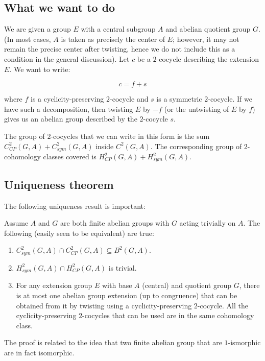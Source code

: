\documentclass[10pt]{amsart}
\begin{document}
\subsection{What we want to do}

We are given a group $E$ with a central subgroup $A$ and abelian
quotient group $G$. (In most cases, $A$ is taken as precisely the
center of $E$; however, it may not remain the precise center after
twisting, hence we do not include this as a condition in the general
discussion). Let $c$ be a $2$-cocycle describing the extension $E$. We
want to write:

$$c = f + s$$

where $f$ is a cyclicity-preserving $2$-cocycle and $s$ is a symmetric
$2$-cocycle. If we have such a decomposition, then twisting $E$ by
$-f$ (or the untwisting of $E$ by $f$) gives us an abelian group
described by the $2$-cocycle $s$.

The group of $2$-cocycles that we can write in this form is the sum
$C^2_{CP}(G,A) + C^2_{sym}(G,A)$ inside $C^2(G,A)$. The corresponding
group of $2$-cohomology classes covered is $H^2_{CP}(G,A) +
H^2_{sym}(G,A)$.

\subsection{Uniqueness theorem}

The following uniqueness result is important:

\begin{theorem}\label{uniqueness}
  Assume $A$ and $G$ are both finite abelian groups with $G$ acting
  trivially on $A$. The following (easily seen to be equivalent) are
  true:
  \begin{enumerate}
  \item $C^2_{sym}(G,A) \cap C^2_{CP}(G,A) \subseteq B^2(G,A)$.
  \item $H^2_{sym}(G,A) \cap H^2_{CP}(G,A)$ is trivial.
  \item For any extension group $E$ with base $A$ (central) and
    quotient group $G$, there is at most one abelian group extension
    (up to congruence) that can be obtained from it by twisting using
    a cyclicity-preserving $2$-cocycle. All the cyclicity-preserving
    $2$-cocycles that can be used are in the same cohomology class.
  \end{enumerate}
\end{theorem}

The proof is related to the idea that two finite abelian group that
are $1$-ismorphic are in fact isomorphic.
\end{document}
